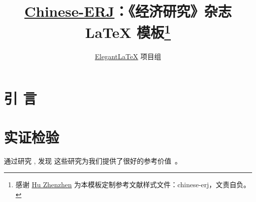 \documentclass{chinese-erj}
\title{\href{https://github.com/EthanDeng/Chinese-ERJ}{Chinese-ERJ}：《经济研究》杂志 \LaTeX{} 模板\thanks{感谢 \href{https://github.com/hushidong}{Hu Zhenzhen} 为本模板定制参考文献样式文件：chinese-erj，文责自负。}}
\author{\href{https://github.com/ElegantLaTeX}{Elegant\LaTeX{}} 项目组}
\date{}
\begin{document}
\maketitle

\begin{abstract}
\zhlipsum*[5]
\end{abstract}

\section{引   言}
\zhlipsum[2-6]

\section{实证检验}
\zhlipsum[7-10]

\textcite{cn1} 通过研究 \zhlipsum*[1], \textcite{cn2,cn3} 发现 \zhlipsum*[2] 这些研究为我们提供了很好的参考价值~\cite{en1,en2,en3}。

\nocite{*}
\erjref
\printbibliography[heading=none]
\enmaketitle
\end{document}
